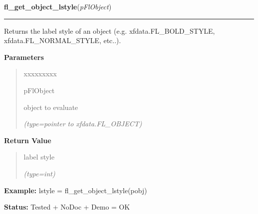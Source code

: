     \vspace{0.5ex}

\hspace{.8\funcindent}\begin{boxedminipage}{\funcwidth}

    \raggedright \textbf{fl\_get\_object\_lstyle}(\textit{pFlObject})

    \vspace{-1.5ex}

    \rule{\textwidth}{0.5\fboxrule}
\setlength{\parskip}{2ex}
    Returns the label style of an object (e.g. xfdata.FL\_BOLD\_STYLE, 
    xfdata.FL\_NORMAL\_STYLE, etc..).

\setlength{\parskip}{1ex}
      \textbf{Parameters}
      \vspace{-1ex}

      \begin{quote}
        \begin{Ventry}{xxxxxxxxx}

          \item[pFlObject]

          object to evaluate

            {\it (type=pointer to xfdata.FL\_OBJECT)}

        \end{Ventry}

      \end{quote}

      \textbf{Return Value}
    \vspace{-1ex}

      \begin{quote}
      label style

      {\it (type=int)}

      \end{quote}

\textbf{Example:} lstyle = fl\_get\_object\_lstyle(pobj)



\textbf{Status:} Tested + NoDoc + Demo = OK



    \end{boxedminipage}

    \label{xformslib:flbasic:fl_set_object_lcol}

    \vspace{0.5ex}

